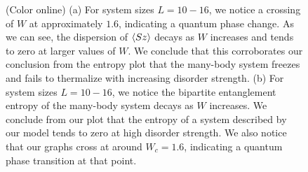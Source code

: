 \documentclass[prl,aps,epsf,showpacs,twocolumn]{revtex4}
\begin{document}
\begin{figure}
  \caption{(Color online) (a) For system sizes $L = 10-16$, we notice a crossing
    of $W$ at approximately $1.6$, indicating a quantum phase change.
    As we can see, the dispersion of $\braket{Sz}$ decays as $W$ increases and
    tends to zero at larger values of $W$.
    We conclude that this corroborates our conclusion from the entropy plot that
    the many-body system freezes and fails to thermalize with increasing
    disorder strength.
    (b) For system sizes $L = 10-16$, we notice the bipartite entanglement
    entropy of the many-body system decays as $W$ increases.
    We conclude from our plot that the entropy of a system described by our
    model tends to zero at high disorder strength.
    We also notice that our graphs cross at around $W_c=1.6$, indicating a
    quantum phase transition at that point.
  }
\label{fig1}
\end{figure}
\end{document}
